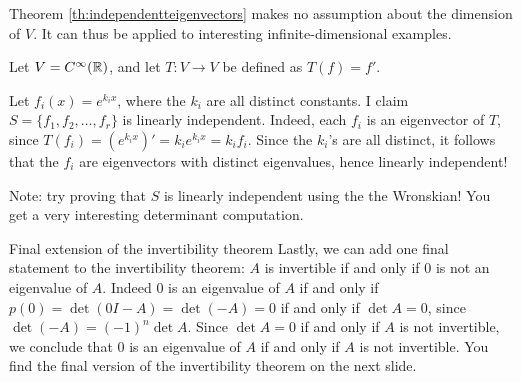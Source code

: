 \begin{frame}
Theorem \ref{th:independentteigenvectors} makes no assumption about the dimension of $V$. It can thus be applied to interesting infinite-dimensional examples. 
\begin{example} 
Let $V=C^\infty({\mathbb R})$, and let $T\colon V\rightarrow V$ be defined as $T(f)=f'$. 

Let $f_i(x)=e^{k_ix}$, where the $k_i$ are all distinct constants. I claim $S=\{f_1,f_2,\dots , f_r\}$ is linearly independent. 
\bpause 
Indeed, each $f_i$ is an eigenvector of $T$, since $T(f_i)=(e^{k_ix})'=k_ie^{k_ix}=k_if_i$. 
\bpause 
Since the $k_i$'s are all distinct, it follows that the $f_i$ are eigenvectors with distinct eigenvalues, hence linearly independent!

\pause Note: try proving that $S$ is linearly independent using the the Wronskian! You get a very interesting determinant computation.  
\end{example}
\end{frame}
\begin{frame}{Final extension of the invertibility theorem}
Lastly, we can add one final statement to the invertibility theorem: $A$ is invertible if and only if $0$ is not an eigenvalue of $A$. 
\bpause 
Indeed $0$ is an eigenvalue of $A$ if and only if $p(0)=\det(0I-A)=\det(-A)=0$ if and only if $\det A=0$, since $\det(-A)=(-1)^n\det A$. \bpause
Since $\det A=0$ if and only if $A$ is not invertible, we conclude that $0$ is an eigenvalue of $A$ if and only if $A$ is not invertible.
\bpause
You find the final version of the invertibility theorem on the next slide. 
\end{frame}
